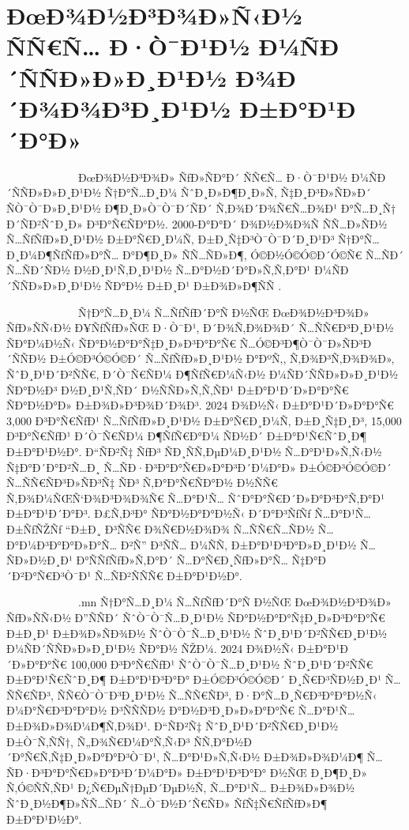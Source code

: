 \documentclass[12pt,A4]{report}
\begin{document}
\section{ÐœÐ¾Ð½Ð³Ð¾Ð»Ñ‹Ð½ ÑÑ€Ñ… Ð·Ò¯Ð¹Ð½ Ð¼ÑÐ´ÑÑÐ»Ð»Ð¸Ð¹Ð½ Ð¾Ð´Ð¾Ð¾Ð³Ð¸Ð¹Ð½ Ð±Ð°Ð¹Ð´Ð°Ð»}

\ \ \ \ \ \ \ \ \  \ \ \ \ ÐœÐ¾Ð½Ð³Ð¾Ð» ÑƒÐ»ÑÐ°Ð´ ÑÑ€Ñ… Ð·Ò¯Ð¹Ð½ Ð¼ÑÐ´ÑÑÐ»Ð»Ð¸Ð¹Ð½ Ñ†Ð°Ñ…Ð¸Ð¼ ÑˆÐ¸Ð»Ð¶Ð¸Ð»Ñ‚
Ñ‡Ð¸Ð³Ð»ÑÐ»Ð´ ÑÒ¯Ò¯Ð»Ð¸Ð¹Ð½ Ð¶Ð¸Ð»Ò¯Ò¯Ð´ÑÐ´ Ñ‚Ð¾Ð´Ð¾Ñ€Ñ…Ð¾Ð¹ Ð°Ñ…Ð¸Ñ† Ð´ÑÐ²ÑˆÐ¸Ð» Ð³Ð°Ñ€ÑÐ°Ð½. 2000-Ð°Ð°Ð´ Ð¾Ð½Ð¾Ð¾Ñ
ÑÑ…Ð»ÑÐ½ Ñ…ÑƒÑƒÐ»Ð¸Ð¹Ð½ Ð±Ð°Ñ€Ð¸Ð¼Ñ‚ Ð±Ð¸Ñ‡Ð³Ò¯Ò¯Ð´Ð¸Ð¹Ð³ Ñ†Ð°Ñ…Ð¸Ð¼Ð¶ÑƒÑƒÐ»Ð°Ñ… Ð°Ð¶Ð¸Ð» ÑÑ…ÑÐ»Ð¶, Ó©Ð½Ó©Ó©Ð´Ó©Ñ€
Ñ…ÑÐ´ Ñ…ÑÐ´ÑÐ½ Ð½Ð¸Ð¹Ñ‚Ð¸Ð¹Ð½ Ñ…Ð°Ð½Ð´Ð°Ð»Ñ‚Ñ‚Ð°Ð¹ Ð¼ÑÐ´ÑÑÐ»Ð»Ð¸Ð¹Ð½ ÑÐ°Ð½ Ð±Ð¸Ð¹ Ð±Ð¾Ð»Ð¶ÑÑ
\cite{monlegalinfo2020}.

\ \ \ \ \ \ \ \ \  \ \ \ \ \legalinfo Ñ†Ð°Ñ…Ð¸Ð¼ Ñ…ÑƒÑƒÐ´Ð°Ñ Ð½ÑŒ ÐœÐ¾Ð½Ð³Ð¾Ð»
ÑƒÐ»ÑÑ‹Ð½ Ð¥ÑƒÑƒÐ»ÑŒ Ð·Ò¯Ð¹, Ð´Ð¾Ñ‚Ð¾Ð¾Ð´ Ñ…ÑÑ€Ð³Ð¸Ð¹Ð½ ÑÐ°Ð¼Ð½Ñ‹ ÑÐ°Ð½Ð°Ð°Ñ‡Ð¸Ð»Ð³Ð°Ð°Ñ€ Ñ…Ó©Ð³Ð¶Ò¯Ò¯Ð»ÑÐ³Ð´ÑÑÐ½ Ð±Ó©Ð³Ó©Ó©Ð´
Ñ…ÑƒÑƒÐ»Ð¸Ð¹Ð½ Ð°ÐºÑ‚, Ñ‚Ð¾Ð³Ñ‚Ð¾Ð¾Ð», ÑˆÐ¸Ð¹Ð´Ð²ÑÑ€, Ð´Ò¯Ñ€ÑÐ¼ Ð¶ÑƒÑ€Ð¼Ñ‹Ð½ Ð¼ÑÐ´ÑÑÐ»Ð»Ð¸Ð¹Ð½ ÑÐ°Ð½Ð³ Ð½Ð¸Ð¹Ñ‚ÑÐ´
Ð½ÑÑÐ»Ñ‚Ñ‚ÑÐ¹ Ð±Ð°Ð¹Ð´Ð»Ð°Ð°Ñ€ ÑÐ°Ð½Ð°Ð» Ð±Ð¾Ð»Ð³Ð¾Ð´Ð¾Ð³. 2024 Ð¾Ð½Ñ‹ Ð±Ð°Ð¹Ð´Ð»Ð°Ð°Ñ€ 3,000 Ð³Ð°Ñ€ÑƒÐ¹ Ñ…ÑƒÑƒÐ»Ð¸Ð¹Ð½
Ð±Ð°Ñ€Ð¸Ð¼Ñ‚ Ð±Ð¸Ñ‡Ð¸Ð³, 15,000 Ð³Ð°Ñ€ÑƒÐ¹ Ð´Ò¯Ñ€ÑÐ¼ Ð¶ÑƒÑ€Ð°Ð¼ ÑÐ½Ð´ Ð±Ð°Ð¹Ñ€ÑˆÐ¸Ð¶ Ð±Ð°Ð¹Ð½Ð°. Ð“ÑÐ²Ñ‡ ÑƒÐ³
ÑÐ¸ÑÑ‚ÐµÐ¼Ð¸Ð¹Ð½ Ñ…Ð°Ð¹Ð»Ñ‚Ñ‹Ð½ Ñ‡Ð°Ð´Ð°Ð²Ñ…Ð¸ Ñ…ÑÐ·Ð³Ð°Ð°Ñ€Ð»Ð°Ð³Ð´Ð¼Ð°Ð» Ð±Ó©Ð³Ó©Ó©Ð´ Ñ…ÑÑ€ÑÐ³Ð»ÑÐ³Ñ‡ ÑÐ³ Ñ‚Ð°Ð°Ñ€ÑÐ°Ð½
Ð½ÑÑ€ Ñ‚Ð¾Ð¼ÑŒÑ‘Ð¾Ð³Ð¾Ð¾Ñ€ Ñ…Ð°Ð¹Ñ… ÑˆÐ°Ð°Ñ€Ð´Ð»Ð°Ð³Ð°Ñ‚Ð°Ð¹ Ð±Ð°Ð¹Ð´Ð°Ð³. Ð£Ñ‚Ð³Ð° ÑÐ°Ð½Ð°Ð°Ð½Ñ‹ Ð´Ð°Ð³ÑƒÑƒ Ñ…Ð°Ð¹Ñ… Ð±ÑƒÑŽÑƒ
``Ð±Ð¸ Ð³ÑÑ€ Ð¾Ñ€Ð½Ð¾Ð¾ Ñ…ÑÑ€Ñ…ÑÐ½ Ñ…Ð°Ð¼Ð³Ð°Ð°Ð»Ð°Ñ… Ð²Ñ'' Ð³ÑÑ… Ð¼ÑÑ‚ Ð±Ð°Ð¹Ð³Ð°Ð»Ð¸Ð¹Ð½ Ñ…ÑÐ»Ð½Ð¸Ð¹ Ð°ÑÑƒÑƒÐ»Ñ‚Ð°Ð´
Ñ…Ð°Ñ€Ð¸ÑƒÐ»Ð°Ñ… Ñ‡Ð°Ð´Ð²Ð°Ñ€Ð³Ò¯Ð¹ Ñ…ÑÐ²ÑÑÑ€ Ð±Ð°Ð¹Ð½Ð°.

\ \ \ \ \ \ \ \ \  \ \ \ \ \shuukh.mn Ñ†Ð°Ñ…Ð¸Ð¼ Ñ…ÑƒÑƒÐ´Ð°Ñ Ð½ÑŒ ÐœÐ¾Ð½Ð³Ð¾Ð» ÑƒÐ»ÑÑ‹Ð½
Ð”ÑÑÐ´ ÑˆÒ¯Ò¯Ñ…Ð¸Ð¹Ð½ ÑÐ°Ð½Ð°Ð°Ñ‡Ð¸Ð»Ð³Ð°Ð°Ñ€ Ð±Ð¸Ð¹ Ð±Ð¾Ð»ÑÐ¾Ð½ ÑˆÒ¯Ò¯Ñ…Ð¸Ð¹Ð½ ÑˆÐ¸Ð¹Ð´Ð²ÑÑ€Ð¸Ð¹Ð½ Ð¼ÑÐ´ÑÑÐ»Ð»Ð¸Ð¹Ð½
ÑÐ°Ð½ ÑŽÐ¼. 2024 Ð¾Ð½Ñ‹ Ð±Ð°Ð¹Ð´Ð»Ð°Ð°Ñ€ 100,000 Ð³Ð°Ñ€ÑƒÐ¹ ÑˆÒ¯Ò¯Ñ…Ð¸Ð¹Ð½ ÑˆÐ¸Ð¹Ð´Ð²ÑÑ€ Ð±Ð°Ð¹Ñ€ÑˆÐ¸Ð¶ Ð±Ð°Ð¹Ð³Ð°Ð°
Ð±Ó©Ð³Ó©Ó©Ð´ Ð¸Ñ€Ð³ÑÐ½Ð¸Ð¹ Ñ…ÑÑ€ÑÐ³, ÑÑ€Ò¯Ò¯Ð³Ð¸Ð¹Ð½ Ñ…ÑÑ€ÑÐ³, Ð·Ð°Ñ…Ð¸Ñ€Ð³Ð°Ð°Ð½Ñ‹ Ð¼Ð°Ñ€Ð³Ð°Ð°Ð½ Ð³ÑÑÑÐ½ Ð°Ð½Ð³Ð¸Ð»Ð»Ð°Ð°Ñ€
Ñ…Ð°Ð¹Ñ… Ð±Ð¾Ð»Ð¾Ð¼Ð¶Ñ‚Ð¾Ð¹. Ð“ÑÐ²Ñ‡ ÑˆÐ¸Ð¹Ð´Ð²ÑÑ€Ð¸Ð¹Ð½ Ð±Ò¯Ñ‚ÑÑ†, Ñ„Ð¾Ñ€Ð¼Ð°Ñ‚Ñ‹Ð³ ÑÑ‚Ð°Ð½Ð´Ð°Ñ€Ñ‚Ñ‡Ð¸Ð»Ð°Ð°Ð³Ò¯Ð¹,
Ñ…Ð°Ð¹Ð»Ñ‚Ñ‹Ð½ Ð±Ð¾Ð»Ð¾Ð¼Ð¶ Ñ…ÑÐ·Ð³Ð°Ð°Ñ€Ð»Ð°Ð³Ð´Ð¼Ð°Ð» Ð±Ð°Ð¹Ð³Ð°Ð° Ð½ÑŒ Ð¸Ð¶Ð¸Ð» Ñ‚Ó©ÑÑ‚ÑÐ¹ Ð¿Ñ€ÐµÑ†ÐµÐ´ÐµÐ½Ñ‚ Ñ…Ð°Ð¹Ñ…
Ð±Ð¾Ð»Ð¾Ð½ ÑˆÐ¸Ð½Ð¶Ð»ÑÑ…ÑÐ´ Ñ…Ò¯Ð½Ð´Ñ€ÑÐ» ÑƒÑ‡Ñ€ÑƒÑƒÐ»Ð¶ Ð±Ð°Ð¹Ð½Ð°.
\end{document}
